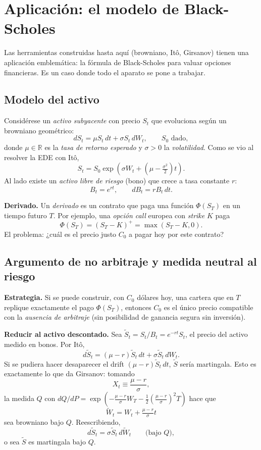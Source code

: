 \documentclass[11pt, a4paper]{article}
\begin{document}
\section{Aplicación: el modelo de Black-Scholes}

Las herramientas construidas hasta aquí (browniano, Itô, Girsanov) tienen una aplicación
emblemática: la fórmula de Black-Scholes para valuar opciones financieras. Es un caso donde
todo el aparato se pone a trabajar.

\subsection{Modelo del activo}

Considérese un \emph{activo subyacente} con precio $S_t$ que evoluciona según un browniano
geométrico:
$$ dS_t = \mu S_t \, dt + \sigma S_t \, dW_t, \qquad S_0 \text{ dado}, $$
donde $\mu \in \mathbb{R}$ es la \emph{tasa de retorno esperado} y $\sigma > 0$ la
\emph{volatilidad}. Como se vio al resolver la EDE con Itô,
$$ S_t = S_0 \exp\!\left(\sigma W_t + \left(\mu - \tfrac{\sigma^2}{2}\right) t\right). $$
Al lado existe un \emph{activo libre de riesgo} (bono) que crece a tasa constante $r$:
$$ B_t = e^{rt}, \qquad dB_t = r B_t \, dt. $$

\textbf{Derivado.} Un \emph{derivado} es un contrato que paga una función $\Phi(S_T)$ en un
tiempo futuro $T$. Por ejemplo, una \emph{opción call} europea con \emph{strike} $K$ paga
$$ \Phi(S_T) = (S_T - K)^+ = \max(S_T - K, 0). $$
El problema: ¿cuál es el precio justo $C_0$ a pagar hoy por este contrato?

\subsection{Argumento de no arbitraje y medida neutral al riesgo}

\textbf{Estrategia.} Si se puede construir, con $C_0$ dólares hoy, una cartera que en $T$
replique exactamente el pago $\Phi(S_T)$, entonces $C_0$ es el único precio compatible con la
\emph{ausencia de arbitraje} (sin posibilidad de ganancia segura sin inversión).

\textbf{Reducir al activo descontado.} Sea $\widetilde{S}_t = S_t / B_t = e^{-rt} S_t$, el precio
del activo medido en bonos. Por Itô,
$$ d\widetilde{S}_t = (\mu - r) \widetilde{S}_t \, dt + \sigma \widetilde{S}_t \, dW_t. $$
Si se pudiera hacer desaparecer el drift $(\mu - r) \widetilde{S}_t \, dt$, $\widetilde{S}$
sería
martingala. Esto es exactamente lo que da Girsanov: tomando
$$ X_t \equiv \frac{\mu - r}{\sigma}, $$
la medida $Q$ con $dQ/dP = \exp(-\tfrac{\mu - r}{\sigma} W_T - \tfrac{1}{2}(\tfrac{\mu-r}{\sigma})^2
T)$
hace que
$$ \widetilde{W}_t = W_t + \tfrac{\mu - r}{\sigma} t $$
sea browniano bajo $Q$. Reescribiendo,
$$ d\widetilde{S}_t = \sigma \widetilde{S}_t \, d\widetilde{W}_t \qquad \text{(bajo $Q$)}, $$
o sea $\widetilde{S}$ es martingala bajo $Q$.
\end{document}
